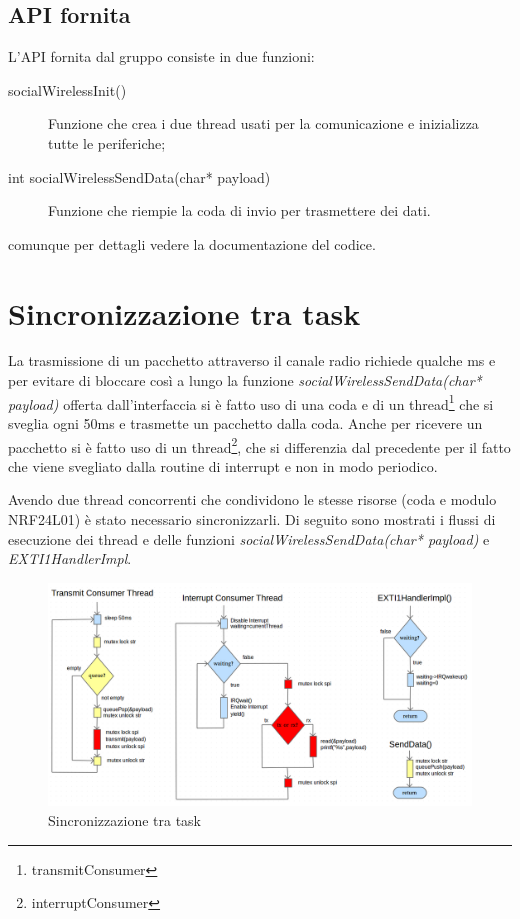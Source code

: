 \section{API fornita}
L'API fornita dal gruppo consiste in due funzioni:
\begin{description}
	\item [socialWirelessInit()] Funzione che crea i due thread usati per la comunicazione e inizializza tutte le periferiche;
	\item [int socialWirelessSendData(char* payload)] Funzione che riempie la coda di invio per trasmettere dei dati. 
\end{description}
comunque per dettagli vedere la documentazione del codice\cite{social-wireless}.

\chapter{Sincronizzazione tra task}
La trasmissione di un pacchetto attraverso il canale radio richiede qualche ms e per evitare di bloccare così a lungo la funzione \emph{socialWirelessSendData(char* payload)} offerta dall'interfaccia si è fatto uso di una coda e di un thread\footnote{transmitConsumer} che si sveglia ogni 50ms e trasmette un pacchetto dalla coda. Anche per ricevere un pacchetto si è fatto uso di un thread\footnote{interruptConsumer}, che si differenzia dal precedente per il fatto che viene svegliato dalla routine di interrupt e non in modo periodico.\par
Avendo due thread concorrenti che condividono le stesse risorse (coda e modulo NRF24L01) è stato necessario sincronizzarli. Di seguito sono mostrati i flussi di esecuzione dei thread e delle funzioni \emph{socialWirelessSendData(char* payload)} e \emph{EXTI1HandlerImpl}.
\begin{figure}[H]
	\centering
	\includegraphics[width=1\textwidth]{figure/thread-sinc-v2.png}
	\caption{Sincronizzazione tra task}
\end{figure}

